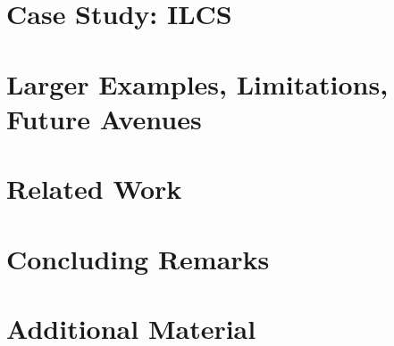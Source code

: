 \documentclass[conference]{IEEEtran}
\begin{document}
\section{Case Study: ILCS}
\label{sec:ilcs-case-study}

%

\clearpage

\section{Larger Examples, Limitations, Future Avenues}
\label{sec:lulesh}




\section{Related Work}
\label{sec:related}


\clearpage

\section{Concluding Remarks}
\label{sec:discussion}


\clearpage

    



\clearpage

\appendix
\section{Additional Material}
%
\end{document}
